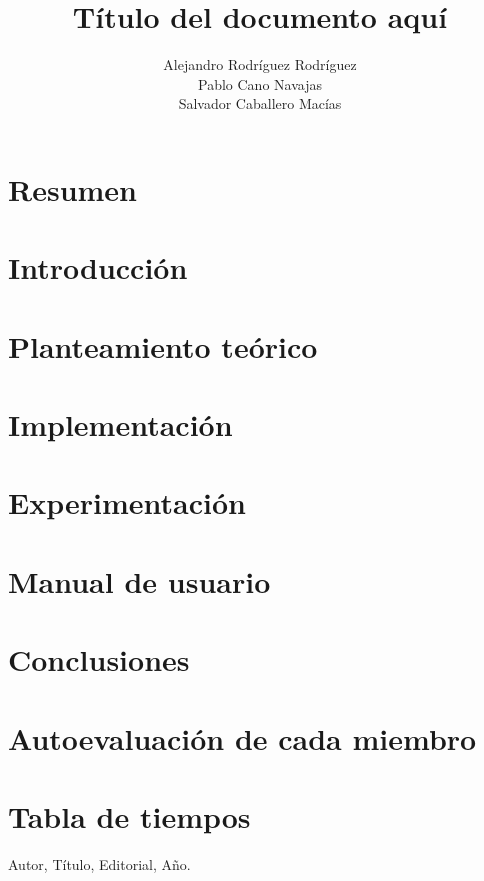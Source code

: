\documentclass[a4paper]{article}
\title{Título del documento aquí}
\author{Alejandro Rodríguez Rodríguez \\ Pablo Cano Navajas \\ Salvador Caballero Macías}
\begin{document}
\maketitle

\newpage
\tableofcontents

\newpage
\section{Resumen}

\section{Introducción}

\section{Planteamiento teórico}

\section{Implementación}

\section{Experimentación}

\section{Manual de usuario}

\section{Conclusiones}

\section{Autoevaluación de cada miembro}

\section{Tabla de tiempos}

\begin{thebibliography}{9}
 Autor, Título, Editorial, Año.
\end{thebibliography}
\end{document}
